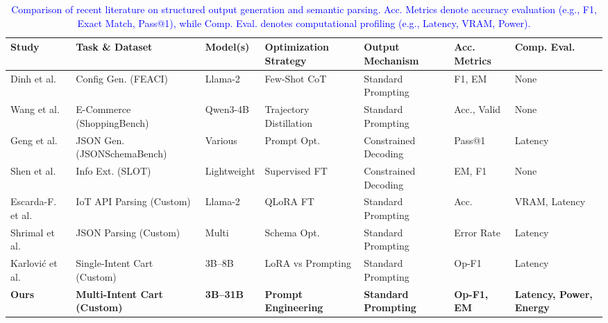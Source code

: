 \documentclass[journal,article,submit,pdftex,moreauthors]{Definitions/mdpi}
\begin{document}
\begin{table}[H]
\caption{\textcolor{blue}{Comparison of recent literature on structured output generation and semantic parsing. Acc. Metrics denote accuracy evaluation (e.g., F1, Exact Match, Pass@1), while Comp. Eval. denotes computational profiling (e.g., Latency, VRAM, Power).}}\label{tab:lit_review}
\footnotesize
\setlength{\tabcolsep}{3pt}
\renewcommand{\arraystretch}{1.3} 
\begin{tabularx}{\textwidth}{l >{\raggedright\arraybackslash}X l >{\raggedright\arraybackslash}X >{\raggedright\arraybackslash}X l >{\raggedright\arraybackslash}X}
\toprule
\textbf{Study} & \textbf{Task \& Dataset} & \textbf{Model(s)} & \textbf{Optimization Strategy} & \textbf{Output Mechanism} & \textbf{Acc. Metrics} & \textbf{Comp. Eval.} \\
\midrule
Dinh et al. \cite{dinh2025towards} & Config Gen. (FEACI) & Llama-2 & Few-Shot CoT & Standard Prompting & F1, EM & None \\
Wang et al. \cite{wang2026shoppingbench} & E-Commerce (ShoppingBench) & Qwen3-4B & Trajectory Distillation & Standard Prompting & Acc., Valid & None \\
Geng et al. \cite{geng2025jsonschemabenchrigorousbenchmarkstructured} & JSON Gen. (JSONSchemaBench) & Various & Prompt Opt. & Constrained Decoding & Pass@1 & Latency \\
Shen et al. \cite{shen2025slot} & Info Ext. (SLOT) & Lightweight & Supervised FT & Constrained Decoding & EM, F1 & None \\
Escarda-F. et al. \cite{escarda2024llms} & IoT API Parsing (Custom) & Llama-2 & QLoRA FT & Standard Prompting & Acc. & VRAM, Latency \\
Shrimal et al. \cite{shrimal2025parse} & JSON Parsing (Custom) & Multi & Schema Opt. & Standard Prompting & Error Rate & Latency \\
Karlović et al. \cite{karlovic2026} & Single-Intent Cart (Custom) & 3B--8B & LoRA vs Prompting & Standard Prompting & Op-F1 & Latency \\
\midrule
\textbf{Ours} & \textbf{Multi-Intent Cart (Custom)} & \textbf{3B--31B} & \textbf{Prompt Engineering} & \textbf{Standard Prompting} & \textbf{Op-F1, EM} & \textbf{Latency, Power, Energy} \\
\bottomrule
\end{tabularx}
\end{table}
\end{document}
